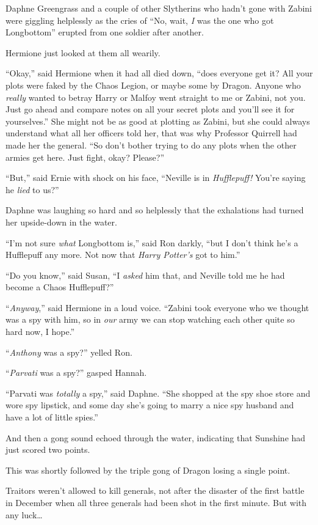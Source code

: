 Daphne Greengrass and a couple of other Slytherins who hadn’t gone with Zabini were giggling helplessly as the cries of
“No, wait, \emph{I} was the one who got Longbottom” erupted from one soldier after another.

Hermione just looked at them all wearily.

“Okay,” said Hermione when it had all died down, “does everyone get it? All your plots were faked by the Chaos Legion, or maybe some by Dragon. Anyone who \emph{really} wanted to betray Harry or Malfoy went straight to me or Zabini, not you. Just go ahead and compare notes on all your secret plots and you’ll see it for yourselves.” She might not be as good at plotting as Zabini, but she could always understand what all her officers told her, that was why Professor Quirrell had made her the general.
“So don’t bother trying to do any plots when the other armies get here. Just fight, okay? Please?”

“But,” said Ernie with shock on his face,
“Neville is in \emph{Hufflepuff!} You’re saying he \emph{lied} to us?”

Daphne was laughing so hard and so helplessly that the exhalations had turned her upside-down in the water.

“I’m not sure \emph{what} Longbottom is,” said Ron darkly, “but I don’t think he’s a Hufflepuff any more. Not now that \emph{Harry Potter’s} got to him.”

“Do you know,” said Susan,
“I \emph{asked} him that, and Neville told me he had become a Chaos Hufflepuff?”

“\emph{Anyway},” said Hermione in a loud voice.
“Zabini took everyone who we thought was a spy with him, so in \emph{our} army we can stop watching each other quite so hard now, I hope.”

“\emph{Anthony} was a spy?” yelled Ron.

“\emph{Parvati} was a spy?” gasped Hannah.

“Parvati was \emph{totally} a spy,” said Daphne.
“She shopped at the spy shoe store and wore spy lipstick, and some day she’s going to marry a nice spy husband and have a lot of little spies.”

And then a gong sound echoed through the water, indicating that Sunshine had just scored two points.

This was shortly followed by the triple gong of Dragon losing a single point.

Traitors weren’t allowed to kill generals, not after the disaster of the first battle in December when all three generals had been shot in the first minute. But with any luck…

